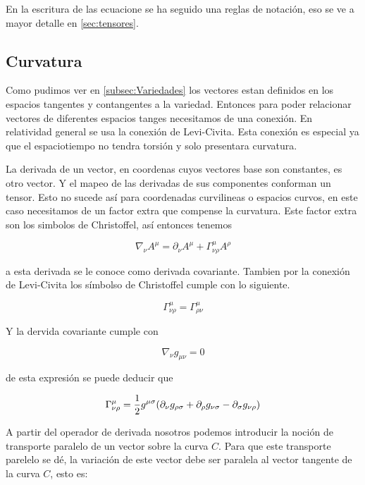 \documentclass[../Main.tex]{subfiles}
\begin{document}
En la escritura de las ecuacione se ha seguido una reglas de notación, eso se ve a mayor detalle en \ref{sec:tensores}.

\subsection{Curvatura}
Como pudimos ver en \ref{subsec:Variedades} los vectores estan definidos en los espacios tangentes y contangentes a la variedad. Entonces para poder relacionar vectores de diferentes espacios tanges necesitamos de una conexión. En relatividad general se usa la conexión de Levi-Civita. Esta conexión es especial ya que el espaciotiempo no tendra torsión y solo presentara curvatura.

La derivada de un vector, en coordenas cuyos vectores base son constantes, es otro vector. Y el mapeo de las derivadas de sus componentes conforman un tensor. Esto no sucede así para coordenadas curvilineas o espacios curvos, en este caso necesitamos de un factor extra que compense la curvatura. Este factor extra son los simbolos de Christoffel, así entonces tenemos

\begin{equation}
    \nabla_{\nu}{A}^{\mu} = \partial_{\nu}{A}^{\mu}+\Gamma^{\mu}_{\nu\rho}A^{\rho}
\end{equation}

a esta derivada se le conoce como derivada covariante. Tambien por la conexión de Levi-Civita los símbolso de Christoffel cumple con lo siguiente.

\begin{equation}
    \Gamma^{\mu}_{\nu\rho} = \Gamma^{\mu}_{\rho\nu}
\end{equation}

Y la dervida covariante cumple con

\begin{equation}
    \nabla_{\nu}{g_{\mu\nu}} = 0
\end{equation}

de esta expresión se puede deducir que

\begin{equation}
    \Gamma^{\mu}_{\nu\rho} = \dfrac{1}{2}g^{\mu\sigma}\qty(\partial_{\nu}{g_{\rho\sigma}}+\partial_{\rho}{g_{\nu\sigma}}-\partial_{\sigma}{g_{\nu\rho}})
\end{equation}

A partir del operador de derivada nosotros podemos introducir la noción de transporte paralelo de un vector sobre la curva $C$. Para que este transporte parelelo se dé, la variación de este vector debe ser paralela al vector tangente de la curva $C$, esto es:
\end{document}
